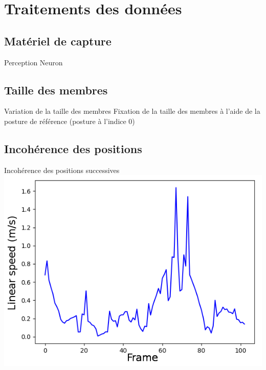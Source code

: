 \documentclass[svgnames]{beamer}
\begin{document}
	\section{Traitements des données}
	
	\subsection{Matériel de capture}
	\begin{frame}{Perception Neuron}
		
	\end{frame}
	
	\subsection{Taille des membres}
	\begin{frame}{Variation de la taille des membres}
		Fixation de la taille des membres à l'aide de la posture de référence (posture à l'indice 0)
	\end{frame}
	
	\subsection{Incohérence des positions}
	\begin{frame}{Incohérence des positions successives}
	\centering
		\includegraphics[scale=0.7]{img/linear_speed_artifacts.png}
	\end{frame}
	
\end{document}
